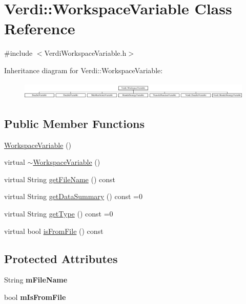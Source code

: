 \hypertarget{class_verdi_1_1_workspace_variable}{\section{\-Verdi\-:\-:\-Workspace\-Variable \-Class \-Reference}
\label{class_verdi_1_1_workspace_variable}
}


{\ttfamily \#include $<$\-Verdi\-Workspace\-Variable.\-h$>$}

\-Inheritance diagram for \-Verdi\-:\-:\-Workspace\-Variable\-:\begin{figure}[H]
\begin{center}
\leavevmode
\includegraphics[height=0.829015cm]{class_verdi_1_1_workspace_variable}
\end{center}
\end{figure}
\subsection*{\-Public \-Member \-Functions}
\begin{DoxyCompactItemize}
\item 
\hyperlink{class_verdi_1_1_workspace_variable_a2a4848591f2a59ef28bb3db753545616}{\-Workspace\-Variable} ()
\item 
virtual \hyperlink{class_verdi_1_1_workspace_variable_adf651101d3f9abdeadddfaf2b976aa00}{$\sim$\-Workspace\-Variable} ()
\item 
virtual \-String \hyperlink{class_verdi_1_1_workspace_variable_adab1b1ec2abaabe1a4a4f89cc2d0abfa}{get\-File\-Name} () const 
\item 
virtual \-String \hyperlink{class_verdi_1_1_workspace_variable_a505b499ade8878d66cdccd84d1824380}{get\-Data\-Summary} () const =0
\item 
virtual \-String \hyperlink{class_verdi_1_1_workspace_variable_a1c005e202b9f840acf2e56cccde4ac66}{get\-Type} () const =0
\item 
virtual bool \hyperlink{class_verdi_1_1_workspace_variable_a09056cd2788871e26e300f26bf33d9ae}{is\-From\-File} () const 
\end{DoxyCompactItemize}
\subsection*{\-Protected \-Attributes}
\begin{DoxyCompactItemize}
\item 
\hypertarget{class_verdi_1_1_workspace_variable_a4e62b74c50f5b48a78edf3964d91db01}{\-String {\bfseries m\-File\-Name}}\label{class_verdi_1_1_workspace_variable_a4e62b74c50f5b48a78edf3964d91db01}

\item 
\hypertarget{class_verdi_1_1_workspace_variable_a473e44e75d702f1d8a3a6c137a4242e9}{bool {\bfseries m\-Is\-From\-File}}\label{class_verdi_1_1_workspace_variable_a473e44e75d702f1d8a3a6c137a4242e9}

\end{DoxyCompactItemize}



